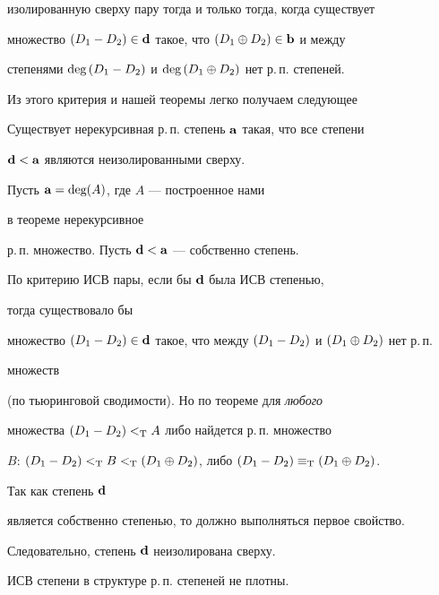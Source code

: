 изолированную сверху пару тогда и только тогда, когда существует \re{}


множество $\draz\in\dg{d}$ такое, что $(D_1\oplus D_2)\in{\bold b}$ и между


степенями $\text{deg\,}\draz$ и $\text{deg\,}(D_1\oplus D_2)$ нет р.\,п. степеней.


Из этого критерия и нашей теоремы легко получаем следующее





\begin{cor}\label{NEI}


Существует нерекурсивная р.\,п. степень ${\bold a}$ такая, что все \re{} степени


${\bold d}<{\bold a}$ являются неизолированными сверху.


\end{cor}





\begin{pf}


Пусть ${\bold a}=\text{deg}(A)$, где $A$ --- построенное нами


в теореме нерекурсивное


р.\,п. множество. Пусть ${\bold d}<{\bold a}$ --- собственно \re{} степень.


По критерию ИСВ пары, если бы ${\bold d}$ была ИСВ степенью,


тогда существовало бы


\re{} множество $\draz\in\dg{d}$ такое, что между $\draz$ и $(D_1\oplus D_2)$ нет р.\,п.


множеств


(по тьюринговой сводимости). Но по теореме для {\it любого} \re{}


множества $\draz<_{\mathrm T}A$ либо найдется р.\,п. множество


$B$: $\draz<_{\mathrm T}


B<_{\mathrm T}\dsum$, либо $\draz\equiv_{\mathrm T}\dsum$.


Так как степень ${\bold d}$


является собственно \re{} степенью, то должно выполняться первое свойство. 


Следовательно, степень ${\bold d}$ неизолирована сверху.


\end{pf}





\begin{cor}


ИСВ степени в структуре р.\,п. степеней не плотны.


\end{cor}





